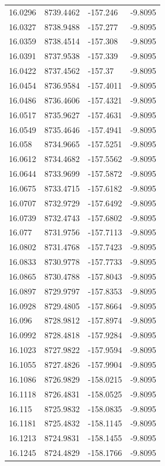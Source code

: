 \begin{table}[H]
\begin{tabular}{llll}
16.0296 & 8739.4462 & -157.246 & -9.8095 \\
16.0327 & 8738.9488 & -157.277 & -9.8095 \\
16.0359 & 8738.4514 & -157.308 & -9.8095 \\
16.0391 & 8737.9538 & -157.339 & -9.8095 \\
16.0422 & 8737.4562 & -157.37 & -9.8095 \\
16.0454 & 8736.9584 & -157.4011 & -9.8095 \\
16.0486 & 8736.4606 & -157.4321 & -9.8095 \\
16.0517 & 8735.9627 & -157.4631 & -9.8095 \\
16.0549 & 8735.4646 & -157.4941 & -9.8095 \\
16.058 & 8734.9665 & -157.5251 & -9.8095 \\
16.0612 & 8734.4682 & -157.5562 & -9.8095 \\
16.0644 & 8733.9699 & -157.5872 & -9.8095 \\
16.0675 & 8733.4715 & -157.6182 & -9.8095 \\
16.0707 & 8732.9729 & -157.6492 & -9.8095 \\
16.0739 & 8732.4743 & -157.6802 & -9.8095 \\
16.077 & 8731.9756 & -157.7113 & -9.8095 \\
16.0802 & 8731.4768 & -157.7423 & -9.8095 \\
16.0833 & 8730.9778 & -157.7733 & -9.8095 \\
16.0865 & 8730.4788 & -157.8043 & -9.8095 \\
16.0897 & 8729.9797 & -157.8353 & -9.8095 \\
16.0928 & 8729.4805 & -157.8664 & -9.8095 \\
16.096 & 8728.9812 & -157.8974 & -9.8095 \\
16.0992 & 8728.4818 & -157.9284 & -9.8095 \\
16.1023 & 8727.9822 & -157.9594 & -9.8095 \\
16.1055 & 8727.4826 & -157.9904 & -9.8095 \\
16.1086 & 8726.9829 & -158.0215 & -9.8095 \\
16.1118 & 8726.4831 & -158.0525 & -9.8095 \\
16.115 & 8725.9832 & -158.0835 & -9.8095 \\
16.1181 & 8725.4832 & -158.1145 & -9.8095 \\
16.1213 & 8724.9831 & -158.1455 & -9.8095 \\
16.1245 & 8724.4829 & -158.1766 & -9.8095 \\

\end{tabular}
\end{table}
